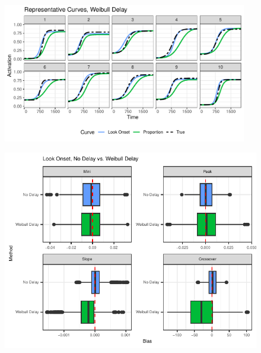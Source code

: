 \documentclass{beamer}
\begin{document}
\begin{frame}
\begin{figure}[H]
\centering
\includegraphics[width=0.95\textwidth]{rep_curves_weibull_delay.pdf}
\end{figure}
\end{frame}




\begin{frame}
\begin{figure}[H]
\centering
\includegraphics{compare_bar_plot.pdf}
\end{figure}
\end{frame}
\end{document}
